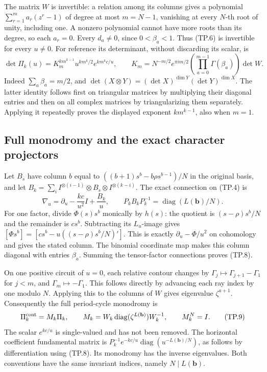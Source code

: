The matrix \(W\) is invertible: a relation among its columns gives
a polynomial \(\sum_{r=1}^{m}a_r(z^r-1)\) of degree at most
\(m=N-1\), vanishing at every \(N\)-th root of unity, including
one. A nonzero polynomial cannot have more roots than its degree,
so each \(a_r=0\). Every \(d_a\ne0\), since \(0<\beta_a<1\).
Thus (TP.6) is invertible for every \(u\ne0\). For reference its
determinant, without discarding its scalar, is
\[
 \det\Pi_k(u)=K_m^{k m^{k-1}}
       u^{k m^k/2}e^{k m^k c/u},\qquad
 K_m=N^{-m/2}e^{\pi i m/2}
       \left(\prod_{a=0}^{m-1}\Gamma(\beta_a)\right)\det W.
 \tag{TP.7}\label{CFStage:eq:tp-determinant}
\]
Indeed \(\sum_a\beta_a=m/2\), and
\(\det(X\otimes Y)=(\det X)^{\dim Y}(\det Y)^{\dim X}\).
The latter identity follows first on triangular matrices by
multiplying their diagonal entries and then on all complex matrices
by triangularizing them separately. Applying it repeatedly proves
the displayed exponent \(k m^{k-1}\), also when \(m=1\).

\subsection{Full monodromy and the exact character projectors}

Let \(B_s\) have column \(b\) equal to
\(((b+1)s^b-b\rho s^{b-1})/N\) in the original basis, and let
\(B_k=\sum_i I^{\otimes(i-1)}\otimes B_s\otimes I^{\otimes(k-i)}\).
The exact connection on (TP.4) is
\[
 \nabla_u=\partial_u-\frac{kc}{u^2}I+\frac{B_k}{u},
 \qquad P_kB_kP_k^{-1}
         =\operatorname{diag}(L(\mathbf b)/N).
 \tag{TP.8}\label{CFStage:eq:tp-connection}
\]
For one factor, divide \(\Phi(s)s^b\) monically by \(h(s)\):
the quotient is \((s-\rho)s^b/N\) and the remainder is \(cs^b\).
Subtracting its \(L_u\)-image gives
\([\Phi s^b]=[cs^b-u((s-\rho)s^b/N)']\).
This is exactly \(\partial_u-\Phi/u^2\) on cohomology and gives
the stated column. The binomial coordinate map makes this column
diagonal with entries \(\beta_a\). Summing the tensor-factor
connections proves (TP.8).

On one positive circuit of \(u=0\), each relative contour changes
by \(\Gamma_j\mapsto\Gamma_{j+1}-\Gamma_1\) for \(j<m\), and
\(\Gamma_m\mapsto-\Gamma_1\). This follows directly by advancing
each ray index by one modulo \(N\). Applying this to the columns
of \(W\) gives eigenvalue \(\zeta^{a+1}\).
Consequently the full period-cycle monodromy is
\[
 \Pi_k^{\rm cont}=M_k\Pi_k,\qquad
 M_k=W_k\operatorname{diag}(\zeta^{L(\mathbf b)})W_k^{-1},
 \qquad M_k^N=I.
 \tag{TP.9}\label{CFStage:eq:tp-monodromy}
\]
The scalar \(e^{kc/u}\) is single-valued and has not been removed.
The horizontal coefficient fundamental matrix is
\(P_k^{-1}e^{-kc/u}\operatorname{diag}(u^{-L(\mathbf b)/N})\),
as follows by differentiation using (TP.8). Its monodromy has the
inverse eigenvalues. Both conventions have the same invariant
indices, namely \(N\mid L(\mathbf b)\).

